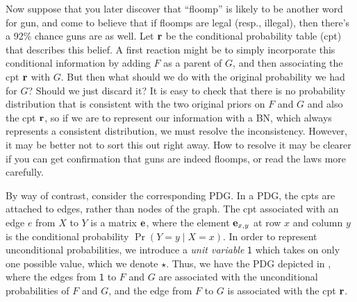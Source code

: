 \documentclass{article}
\newcommand{\MN}{PDG}
\numberwithin{equation}{section}
\begin{document}
\begin{example}
		Now suppose that you later discover that ``floomp'' is likely to be another word for gun, and come to believe that if floomps are legal (resp., illegal), then there's a 92\% chance guns are as well. Let $\mathbf r$ be the conditional probability table (cpt) that describes this belief. A first reaction might be to simply incorporate this conditional information by adding $F$ as a parent of $G$, and then associating the cpt $\mathbf r$ with $G$. But then what should we do with the original probability we had for $G$?  Should we just discard it?
		It is easy to check that there is no probability distribution that is consistent with the two original priors on $F$ and $G$ and also the cpt $\mathbf r$, so if we are to represent our information with a BN, which always represents a consistent distribution, we must resolve the inconsistency.  
%		
		However, it may be better not to sort this out right away. How to resolve it may be clearer if you can get confirmation that guns are indeed floomps, or read the laws more carefully.

		By way of contrast, consider the corresponding \MN.
		In a \MN, the cpts are attached to edges, rather than nodes of the graph. The cpt associated with an edge $e$ from $X$ to $Y$ is a matrix $\mathbf e$, where the element $\mathbf e_{x,y}$ at row $x$ and column $y$ is the conditional probability $\Pr(Y \!\!=\!\!y \mid X \!\!=\!\! x)$. In order to represent unconditional probabilities, we introduce a \emph{unit variable} $\mathsf 1$ which takes on only one possible value,	which we denote $\star$. Thus, we have the PDG depicted in , where the edges from $\mathsf 1$ to $F$ and $G$ are associated with the unconditional probabilities of $F$ and $G$, and the edge from $F$ to $G$ is associated with the cpt $\mathbf r$.
		\begin{figure}[htb]
			\centering
\end{figure}
\end{example}
\end{document}
